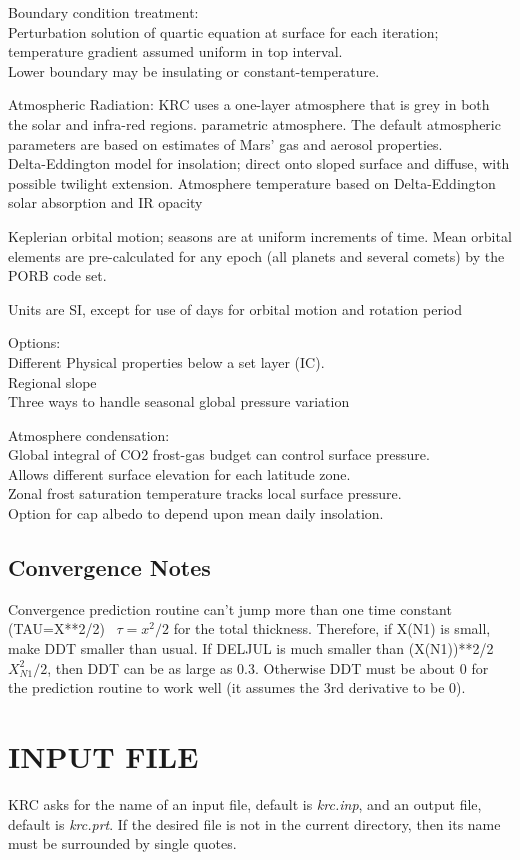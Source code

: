 \documentclass[draft]{article}  %
\newcommand{\qi}{\\ \hspace*{2.em}}      %
\newcommand{\qii}{\\ \hspace*{4.em}}     %
\newcommand{\nf}{\textit}  %
\begin{document}
Boundary condition treatment:
\qi  Perturbation solution of quartic equation at surface for each iteration;
    temperature gradient assumed uniform in top interval.
\qi  Lower boundary may be insulating or constant-temperature.

Atmospheric Radiation: KRC uses a one-layer atmosphere that is grey in both the
solar and infra-red regions. parametric atmosphere. The default atmospheric
parameters are based on estimates of Mars' gas and aerosol properties.
\qi  Delta-Eddington model for insolation; direct onto sloped surface and diffuse,
with possible twilight extension.
  Atmosphere temperature based on Delta-Eddington solar absorption and IR opacity

Keplerian orbital motion; seasons are at uniform increments of time. Mean 
orbital elements are pre-calculated for any epoch (all planets and several
comets) by the PORB code set.

Units are SI, except for use of days for orbital motion and rotation period 

Options:
\qi  Different Physical properties below a set layer (IC).
\qi  Regional slope
\qi  Three ways to handle seasonal global pressure variation

Atmosphere condensation: 
\qi Global integral of CO2 frost-gas budget can control surface pressure.
\qi Allows different surface elevation for each latitude zone.
\qii  Zonal frost saturation temperature tracks local surface pressure.
\qi Option for cap albedo to depend upon mean daily insolation.

\subsection{Convergence Notes} %

Convergence prediction routine can't jump more than one time constant
(TAU=X**2/2) \ $\tau =x^2/2$ for the total thickness.  Therefore, if X(N1) is
small, make DDT smaller than usual.  If DELJUL is much smaller than (X(N1))**2/2
\ $X_{N1}^2/2$, then DDT can be as large as 0.3.  Otherwise DDT must be about 0
for the prediction routine to work well (it assumes the 3rd derivative to be 0).

\section{INPUT FILE}

KRC asks for the name of an input file, default is \nf{krc.inp}, and an output
file, default is \nf{krc.prt}. If the desired file is not in the current
directory, then its name must be surrounded by single quotes.
\end{document}
